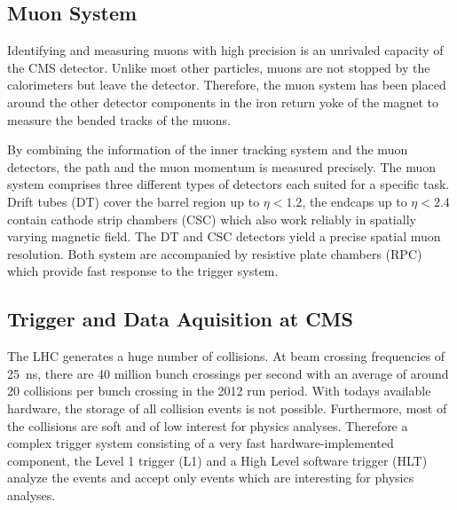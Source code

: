\subsection{Muon System}

Identifying and measuring muons with high precision is an unrivaled capacity of
the CMS detector. Unlike most other particles, muons are not stopped by the
calorimeters but leave the detector. Therefore, the muon system has been placed
around the other detector components in the iron return yoke of the magnet to
measure the bended tracks of the muons.

By combining the information of the inner tracking system and the muon
detectors, the path and the muon momentum is measured precisely. The muon
system comprises three different types of detectors each suited for a specific
task. Drift tubes (DT) cover the barrel region up to $\eta < 1.2$, the endcaps
up to $\eta < 2.4$ contain cathode strip chambers (CSC) which also
work reliably in spatially varying magnetic field. The DT and CSC detectors
yield a precise spatial muon resolution. Both system are accompanied by
resistive plate chambers (RPC) which provide fast response to the trigger
system.

\subsection{Trigger and Data Aquisition at CMS}

The LHC generates a huge number of collisions. At beam crossing frequencies of
\SI{25}{\nano \second}, there are 40 million bunch crossings per second with an
average of around 20 collisions per bunch crossing in the 2012 run period. With
todays available hardware, the storage of all collision events is not possible.
Furthermore, most of the collisions are soft and of low interest for physics
analyses. Therefore a complex trigger system consisting of a very fast
hardware-implemented component, the Level 1 trigger (L1) and a High Level
software trigger (HLT) analyze the events and accept only events which are
interesting for physics analyses.


